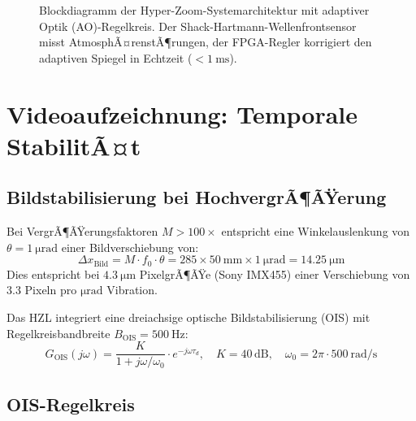 ﻿\documentclass[12pt,a4paper]{article}
\theoremstyle{definition}
\begin{document}
\begin{figure}[H]
		\caption{Blockdiagramm der Hyper-Zoom-Systemarchitektur mit adaptiver Optik
			(AO)-Regelkreis. Der Shack-Hartmann-Wellenfrontsensor misst AtmosphÃ¤renstÃ¶rungen,
			der FPGA-Regler korrigiert den adaptiven Spiegel in Echtzeit ($<\SI{1}{\milli\second}$).}
		\label{fig:system_arch}
	\end{figure}
	
	\section{Videoaufzeichnung: Temporale StabilitÃ¤t}
	
	\subsection{Bildstabilisierung bei HochvergrÃ¶ÃŸerung}
	
	Bei VergrÃ¶ÃŸerungsfaktoren $M > 100\times$ entspricht eine Winkelauslenkung
	von $\theta = \SI{1}{\micro\radian}$ einer Bildverschiebung von:
	\begin{equation}
		\Delta x_\mathrm{Bild} = M\cdot f_0\cdot\theta
		= 285\times\SI{50}{\milli\metre}\times\SI{1}{\micro\radian}
		= \SI{14.25}{\micro\metre}
	\end{equation}
	Dies entspricht bei $\SI{4.3}{\micro\metre}$ PixelgrÃ¶ÃŸe (Sony IMX455)
	einer Verschiebung von $3.3$ Pixeln pro $\si{\micro\radian}$ Vibration.
	
	Das HZL integriert eine dreiachsige optische Bildstabilisierung (OIS)
	mit Regelkreisbandbreite $B_\mathrm{OIS} = \SI{500}{\hertz}$:
	\begin{equation}
		G_\mathrm{OIS}(j\omega) = \frac{K}{1 + j\omega/\omega_0}
		\cdot e^{-j\omega\tau_d},
		\quad
		K = 40\,\mathrm{dB},\quad
		\omega_0 = 2\pi\cdot\SI{500}{\radian\per\second}
		\label{eq:ois_tf}
	\end{equation}
	
	\subsection{OIS-Regelkreis}
	
\end{document}
